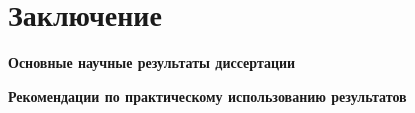 \chapter*{Заключение}

{\bf Основные научные результаты диссертации}
\vspace{3mm}



\vspace{3mm}
{\bf Рекомендации по практическому использованию результатов}
\vspace{3mm}

